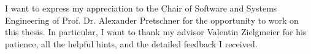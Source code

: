 \documentclass[../main.tex]{subfiles}
\begin{document}
\thispagestyle{empty}

\vspace*{2cm}

\begin{center}
 { \myAcknowTitle}
\end{center}

\vspace{1cm}
\noindent
I want to express my appreciation to the Chair of Software and Systems Engineering of Prof. Dr. Alexander Pretschner for the opportunity to work on this thesis.
In particular, I want to thank my advisor Valentin Zielgmeier for his patience, all the helpful hints, and the detailed feedback I received.
\end{document}
